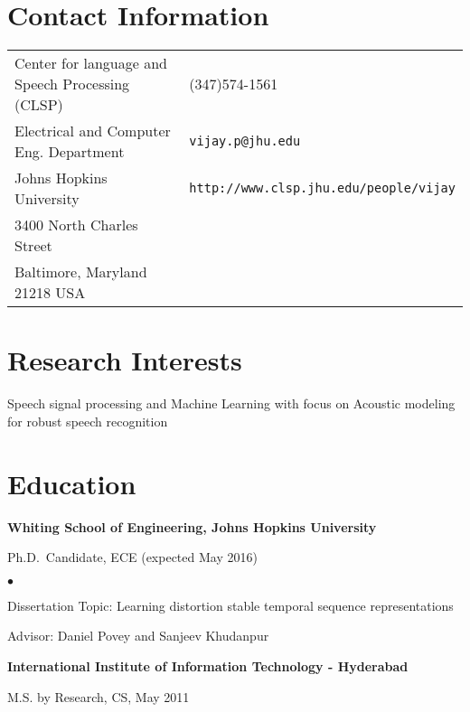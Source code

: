 \documentclass[margin,line,pifont,palatino,courier]{res}
\newenvironment{list1}{
  \begin{list}{\ding{113}}{%
      \setlength{\itemsep}{0in}
      \setlength{\parsep}{0in} \setlength{\parskip}{0in}
      \setlength{\topsep}{0in} \setlength{\partopsep}{0in}
      \setlength{\leftmargin}{0.17in}}}{\end{list}}
\newenvironment{list2}{
  \begin{list}{$\bullet$}{%
      \setlength{\itemsep}{0in}
      \setlength{\parsep}{0in} \setlength{\parskip}{0in}
      \setlength{\topsep}{0in} \setlength{\partopsep}{0in}
      \setlength{\leftmargin}{0.2in}}}{\end{list}}
\begin{document}

\begin{resume}

\section{\sc Contact Information}

\vspace{.05in}
\begin{tabular}{@{}p{2.75in}p{2in}}
Center for language and Speech Processing (CLSP) & (347)574-1561 \\
Electrical and Computer Eng. Department                        & \verb+vijay.p@jhu.edu+\\
Johns Hopkins University                  & \verb+http://www.clsp.jhu.edu/people/vijay+\\
3400 North Charles Street               & \\
Baltimore, Maryland 21218 USA               & \\
\end{tabular}

\section{\sc Research Interests}
Speech signal processing and Machine Learning with focus on Acoustic modeling for robust speech recognition
\section{\sc Education}

{\bf Whiting School of Engineering, Johns Hopkins University}\\
\vspace*{-.1in}
\begin{list1}
\item[] Ph.D.~Candidate, ECE (expected May 2016)

\begin{list2}
\vspace*{.05in}
\item Dissertation Topic:  Learning distortion stable temporal sequence representations
\item Advisor: Daniel Povey and Sanjeev Khudanpur
\end{list2}
\end{list1}

{\bf International Institute of Information Technology - Hyderabad}\\
\vspace*{-.1in}
\begin{list1}
\item[] M.S. by Research, CS, May 2011


\end{list1}
\end{resume}
\end{document}
